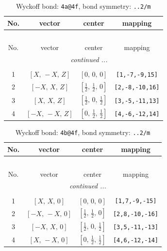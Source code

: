 \documentclass[fleqn,8pt]{jsarticle}
\begin{document}
\begin{longtable}{cccc}
\caption{Wyckoff bond: {\tt 4a@4f}, bond symmetry: {\tt ..2/m}}
 \\
 \hline \hline
No. & vector & center & mapping \\ \hline \endfirsthead

\multicolumn{3}{l}{\tablename\ \thetable{}} \\
 \hline \hline
No. & vector & center & mapping \\ \hline \endhead

 \hline \hline
\multicolumn{3}{r}{\footnotesize\it continued ...} \\ \endfoot

 \hline \hline
\multicolumn{3}{r}{} \\ \endlastfoot

1 & $\left[ X,\, - X,\, Z \right]$ & $\left[ 0,\, 0,\, 0 \right]$ & {\tt [1,-7,-9,15]} \\ \hline
2 & $\left[ - X,\, X,\, Z \right]$ & $\left[ \frac{1}{2},\, \frac{1}{2},\, 0 \right]$ & {\tt [2,-8,-10,16]} \\ \hline
3 & $\left[ X,\, X,\, Z \right]$ & $\left[ \frac{1}{2},\, 0,\, \frac{1}{2} \right]$ & {\tt [3,-5,-11,13]} \\ \hline
4 & $\left[ - X,\, - X,\, Z \right]$ & $\left[ 0,\, \frac{1}{2},\, \frac{1}{2} \right]$ & {\tt [4,-6,-12,14]} \\
\end{longtable}
\renewcommand{\arraystretch}{1.2}
\begin{longtable}{cccc}
\caption{Wyckoff bond: {\tt 4b@4f}, bond symmetry: {\tt ..2/m}}
 \\
 \hline \hline
No. & vector & center & mapping \\ \hline \endfirsthead

\multicolumn{3}{l}{\tablename\ \thetable{}} \\
 \hline \hline
No. & vector & center & mapping \\ \hline \endhead

 \hline \hline
\multicolumn{3}{r}{\footnotesize\it continued ...} \\ \endfoot

 \hline \hline
\multicolumn{3}{r}{} \\ \endlastfoot

1 & $\left[ X,\, X,\, 0 \right]$ & $\left[ 0,\, 0,\, 0 \right]$ & {\tt [1,7,-9,-15]} \\ \hline
2 & $\left[ - X,\, - X,\, 0 \right]$ & $\left[ \frac{1}{2},\, \frac{1}{2},\, 0 \right]$ & {\tt [2,8,-10,-16]} \\ \hline
3 & $\left[ - X,\, X,\, 0 \right]$ & $\left[ \frac{1}{2},\, 0,\, \frac{1}{2} \right]$ & {\tt [3,5,-11,-13]} \\ \hline
4 & $\left[ X,\, - X,\, 0 \right]$ & $\left[ 0,\, \frac{1}{2},\, \frac{1}{2} \right]$ & {\tt [4,6,-12,-14]} \\
\end{longtable}
\end{document}
